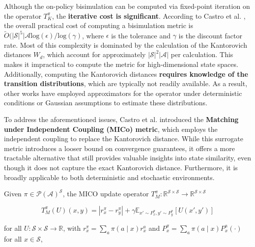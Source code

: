 Although the on-policy bisimulation can be computed via fixed-point iteration on the operator $T_K^\pi$, the \textbf{iterative cost is significant}. According to Castro et al. \cite{castro2021mico}, the overall practical cost of computing a bisimulation metric is $\tilde{O}(|\mathcal{S}|^5 |\mathcal{A} \text{log}(\epsilon)/\text{log}(\gamma)$, where $\epsilon$ is the tolerance and $\gamma$ is the discount factor rate. Most of this complexity is dominated by the calculation of the Kantorovich distances $W_d$, which account for approximately $|\mathcal{S}|^2 |\mathcal{A}|$ per calculation. This makes it impractical to compute the metric for high-dimensional state spaces. Additionally, computing the Kantorovich distances \textbf{requires knowledge of the transition distributions}, which are typically not readily available. As a result, other works have employed approximators for the operator under deterministic conditions \cite{castro2020scalable} or Gaussian assumptions \cite{zhang2020learning} to estimate these distributions.

To address the aforementioned issues, Castro et al. \cite{castro2021mico} introduced the \textbf{Matching under Independent Coupling (MICo) metric}, which employs the independent coupling to replace the Kantorovich distance. While this surrogate metric introduces a looser bound on convergence guarantees, it offers a more tractable alternative that still provides valuable insights into state similarity, even though it does not capture the exact Kantorovich distance. Furthermore, it is broadly applicable to both deterministic and stochastic environments.

\begin{definition} 
\label{def:mico_operator}
Given $\pi \in \mathcal{P(A)}^{\mathcal{S}}$, the MICO update operator $T^\pi_M : \mathbb{R}^{\mathcal{S} \times \mathcal{S}} \rightarrow \mathbb{R}^{\mathcal{S} \times \mathcal{S}}$

\begin{equation}
\label{eq:mico_operator}
    T^\pi_M(U)(x, y) = |r^\pi_{x} - r^\pi_{y}| + \gamma \mathbb{E}_{x'\sim P_x^\pi, y'\sim P_y^\pi}\left[U(x',y') \right]
\end{equation}

for all $U: \mathcal{S} \times \mathcal{S} \rightarrow \mathbb{R}$, with $r_x^\pi =\sum_a \pi(a \mid x) r_x^a$ and $P_x^\pi =\sum_a \pi(a \mid x) P^a_x(\cdot) $ for all $x \in \mathcal{S}$, 
\end{definition}

